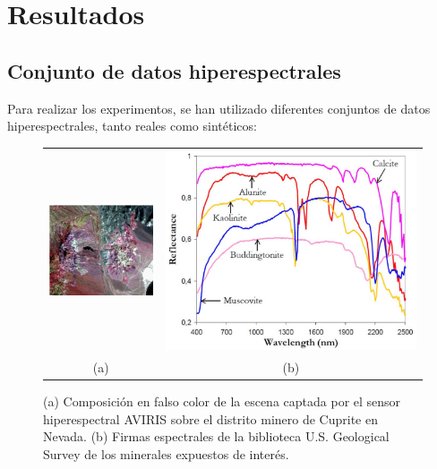 \mbox{}

\chapter{Resultados}
\label{ch:chapte5}

\section{Conjunto de datos hiperespectrales}

Para realizar los experimentos, se han utilizado diferentes conjuntos de datos hiperespectrales, tanto reales como sintéticos:

\begin{figure}
\centering
\begin{tabular}{cc}
\includegraphics[height=0.35\textwidth]{images/cupritecolor.png} &
\includegraphics[height=0.35\textwidth]{images/cupriteSignatures.png}\\
(a) & (b)\\
\end{tabular}
\caption{(a) Composición en falso color de la escena captada por el sensor hiperespectral AVIRIS sobre el distrito minero de Cuprite en Nevada. (b) Firmas espectrales de la biblioteca U.S. Geological Survey de los minerales expuestos de interés.} \label{fig:aviriscuprite}
\end{figure}

